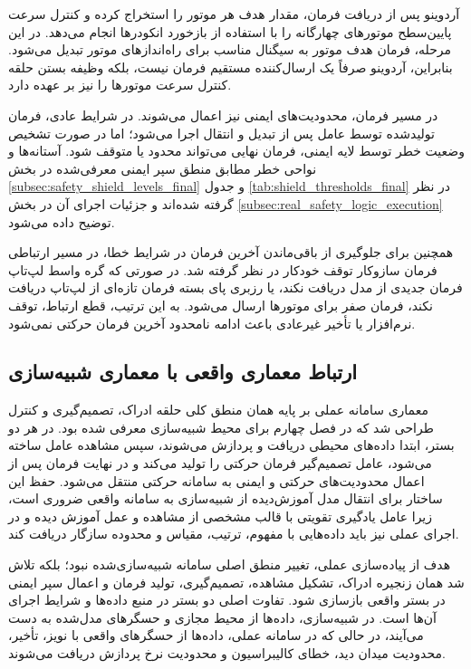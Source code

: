 آردوینو پس از دریافت فرمان، مقدار هدف هر موتور را استخراج کرده و کنترل سرعت پایین‌سطح موتورهای چهارگانه را با استفاده از بازخورد انکودرها انجام می‌دهد. در این مرحله، فرمان هدف موتور به سیگنال مناسب برای راه‌اندازهای موتور تبدیل می‌شود. بنابراین، آردوینو صرفاً یک ارسال‌کننده مستقیم فرمان نیست، بلکه وظیفه بستن حلقه کنترل سرعت موتورها را نیز بر عهده دارد.

در مسیر فرمان، محدودیت‌های ایمنی نیز اعمال می‌شوند. در شرایط عادی، فرمان تولیدشده توسط عامل پس از تبدیل و انتقال اجرا می‌شود؛ اما در صورت تشخیص وضعیت خطر توسط لایه ایمنی، فرمان نهایی می‌تواند محدود یا متوقف شود. آستانه‌ها و نواحی خطر مطابق منطق سپر ایمنی معرفی‌شده در بخش \ref{subsec:safety_shield_levels_final} و جدول \ref{tab:shield_thresholds_final} در نظر گرفته شده‌اند و جزئیات اجرای آن در بخش \ref{subsec:real_safety_logic_execution} توضیح داده می‌شود.

همچنین برای جلوگیری از باقی‌ماندن آخرین فرمان در شرایط خطا، در مسیر ارتباطی فرمان سازوکار توقف خودکار در نظر گرفته شد. در صورتی که گره واسط لپ‌تاپ فرمان جدیدی از مدل دریافت نکند، یا رزبری پای بسته فرمان تازه‌ای از لپ‌تاپ دریافت نکند، فرمان صفر برای موتورها ارسال می‌شود. به این ترتیب، قطع ارتباط، توقف نرم‌افزار یا تأخیر غیرعادی باعث ادامه نامحدود آخرین فرمان حرکتی نمی‌شود.



\subsection{ارتباط معماری واقعی با معماری شبیه‌سازی}
\label{subsec:sim_real_architecture_relation}

معماری سامانه عملی بر پایه همان منطق کلی حلقه ادراک، تصمیم‌گیری و کنترل طراحی شد که در فصل چهارم برای محیط شبیه‌سازی معرفی شده بود. در هر دو بستر، ابتدا داده‌های محیطی دریافت و پردازش می‌شوند، سپس مشاهده عامل ساخته می‌شود، عامل تصمیم‌گیر فرمان حرکتی را تولید می‌کند و در نهایت فرمان پس از اعمال محدودیت‌های حرکتی و ایمنی به سامانه حرکتی منتقل می‌شود. حفظ این ساختار برای انتقال مدل آموزش‌دیده از شبیه‌سازی به سامانه واقعی ضروری است، زیرا عامل یادگیری تقویتی با قالب مشخصی از مشاهده و عمل آموزش دیده و در اجرای عملی نیز باید داده‌هایی با مفهوم، ترتیب، مقیاس و محدوده سازگار دریافت کند.

هدف از پیاده‌سازی عملی، تغییر منطق اصلی سامانه شبیه‌سازی‌شده نبود؛ بلکه تلاش شد همان زنجیره ادراک، تشکیل مشاهده، تصمیم‌گیری، تولید فرمان و اعمال سپر ایمنی در بستر واقعی بازسازی شود. تفاوت اصلی دو بستر در منبع داده‌ها و شرایط اجرای آن‌ها است. در شبیه‌سازی، داده‌ها از محیط مجازی و حسگرهای مدل‌شده به دست می‌آیند، در حالی که در سامانه عملی، داده‌ها از حسگرهای واقعی با نویز، تأخیر، محدودیت میدان دید، خطای کالیبراسیون و محدودیت نرخ پردازش دریافت می‌شوند.

